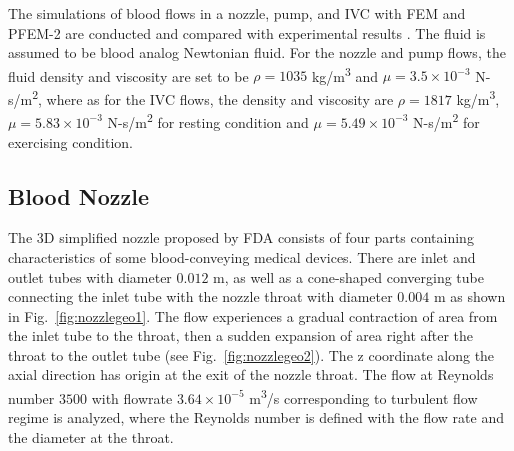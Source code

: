The simulations of blood flows in a nozzle, pump, and IVC with FEM and PFEM-2 are conducted and compared with experimental results \cite{fda_res,fda_nozzle ,fda_pump,gallagher_exp}. The fluid is assumed to be blood analog Newtonian fluid. For the nozzle and pump flows, the fluid density and viscosity are set to be $\rho= 1035$ kg/m\textsuperscript{3} and $\mu =3.5\times10^{-3}$ N-s/m\textsuperscript{2}, where as for the IVC flows, the density and viscosity are $\rho=1817$ kg/m\textsuperscript{3}, $\mu=5.83\times10^{-3}$ N-s/m\textsuperscript{2} for resting condition and $\mu=5.49\times10^{-3}$ N-s/m\textsuperscript{2} for exercising condition. 

\subsection{Blood Nozzle}

The 3D simplified nozzle proposed by FDA consists of four parts containing characteristics of some blood-conveying medical devices. There are inlet and outlet tubes with diameter $0.012$ m, as well as a cone-shaped converging tube connecting the inlet tube with the nozzle throat with diameter $0.004$ m as shown in Fig.~\ref{fig:nozzlegeo1}. The flow experiences a gradual contraction of area from the inlet tube to the throat, then a sudden expansion of area right after the throat to the outlet tube (see Fig.~\ref{fig:nozzlegeo2}). The z coordinate along the axial direction has origin at the exit of the nozzle throat. The flow at Reynolds number $3500$ with flowrate $3.64\times10^{-5}$ m\textsuperscript{3}/s corresponding to turbulent flow regime is analyzed, where the Reynolds number is defined with the flow rate and the diameter at the throat. 


